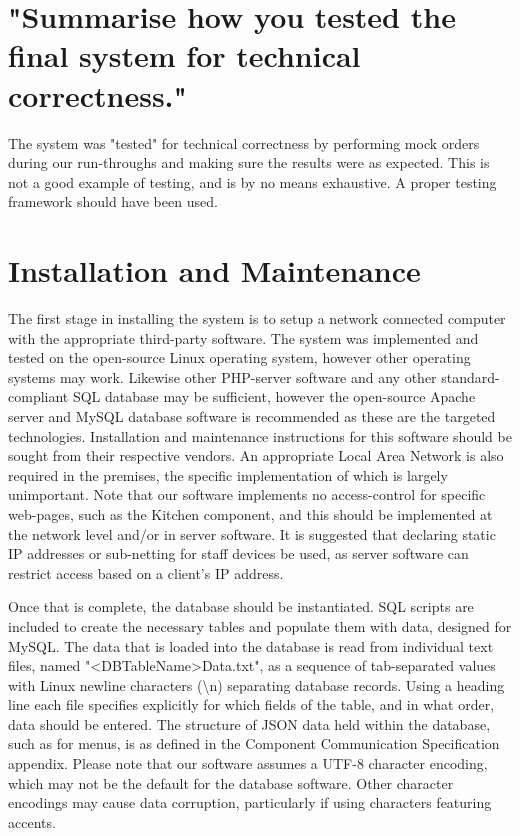 \documentclass[11pt, oneside, a4paper]{report}   %
\begin{document}
\section{"Summarise how you tested the final system for technical correctness."}

The system was "tested" for technical correctness by performing mock orders during our run-throughs and making sure the results were as expected. This is not a good example of testing, and is by no means exhaustive. A proper testing framework should have been used.
\section{Installation and Maintenance}

The first stage in installing the system is to setup a network connected computer with the appropriate third-party software. The system was implemented and tested on the open-source Linux operating system, however other operating systems may work. Likewise other PHP-server software and any other standard-compliant SQL database may be sufficient, however the open-source Apache server and MySQL database software is recommended as these are the targeted technologies. Installation and maintenance instructions for this software should be sought from their respective vendors. An appropriate Local Area Network is also required in the premises, the specific implementation of which is largely unimportant. Note that our software implements no access-control for specific web-pages, such as the Kitchen component, and this should be implemented at the network level and/or in server software. It is suggested that declaring static IP addresses or sub-netting for staff devices be used, as server software can restrict access based on a client's IP address.

Once that is complete, the database should be instantiated. SQL scripts are included to create the necessary tables and populate them with data, designed for MySQL. The data that is loaded into the database is read from individual text files, named "<DBTableName>Data.txt", as a sequence of tab-separated values with Linux newline characters (\textbackslash n) separating database records. Using a heading line each file specifies explicitly for which fields of the table, and in what order, data should be entered. The structure of JSON data held within the database, such as for menus, is as defined in the Component Communication Specification appendix. Please note that our software assumes a UTF-8 character encoding, which may not be the default for the database software. Other character encodings may cause data corruption, particularly if using characters featuring accents.
\end{document}
